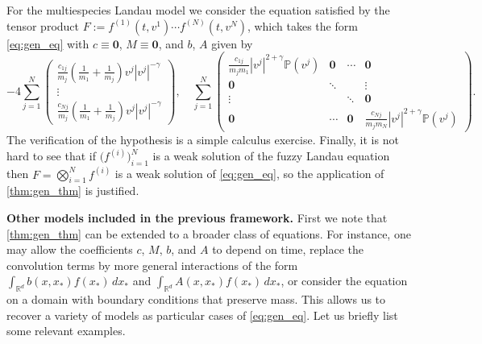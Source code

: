 \documentclass[10pt,oneside]{amsart}
\numberwithin{equation}{section}
\numberwithin{definition}{section}
\numberwithin{theorem}{section}
\numberwithin{lemma}{section}
\begin{document}
For the multiespecies Landau model we consider the equation satisfied by the tensor product $F:=f^{(1)}(t,v^1)\cdots f^{(N)}(t,v^N)$, which takes the form \eqref{eq:gen_eq} with $c \equiv \mathbf{0}$, $M \equiv \mathbf{0}$, and $b$, $A$ given by
%
\begin{equation*}
  -4\sum_{j=1}^N
  \begin{pmatrix}
    \frac{c_{1j}}{m_{j}}\left(\frac{1}{m_{1}}+\frac{1}{m_{j}}\right)v^{j}|v^{j}|^{-\gamma}\\
    \vdots\\
    \frac{c_{Nj}}{m_{j}}\left(\frac{1}{m_{1}}+\frac{1}{m_{j}}\right)v^{j}|v^{j}|^{-\gamma}
  \end{pmatrix},
  \quad 
  \sum_{j=1}^N
  \begin{pmatrix}\frac{c_{1j}}{m_{j}m_{1}}|v^{j}|^{2+\gamma}\mathbb{P}(v^{j}) & \mathbf{0} & \cdots & \mathbf{0}\\
  \mathbf{0} & \ddots &  & \vdots\\
  \vdots &  & \ddots & \mathbf{0}\\
  \mathbf{0} & \cdots & \mathbf{0} & \frac{c_{Nj}}{m_{j}m_{N}}|v^{j}|^{2+\gamma}\mathbb{P}(v^{j})
  \end{pmatrix}.
\end{equation*}
%
The verification of the hypothesis is a simple calculus exercise. Finally, it is not hard to see that if $\big(f^{(i)}\big)_{i=1}^N$ is a weak solution of the fuzzy Landau equation then $F=\bigotimes_{i=1}^Nf^{(i)}$ is a weak solution of \cref{eq:gen_eq}, so the application of \cref{thm:gen_thm} is justified.

\textbf{Other models included in the previous framework.} First we note that \cref{thm:gen_thm} can be extended to a broader class of equations. For instance, one may allow the coefficients $c$, $M$, $b$, and $A$ to depend on time, replace the convolution terms by more general interactions of the form $\int_{\mathbb{R}^d} b(x,x_*) f(x_*)\,dx_*$ and $\int_{\mathbb{R}^d} A(x,x_*) f(x_*)\,dx_*$, or consider the equation on a domain with boundary conditions that preserve mass. This allows us to recover a variety of models as particular cases of \cref{eq:gen_eq}. Let us briefly list some relevant examples.
\end{document}
